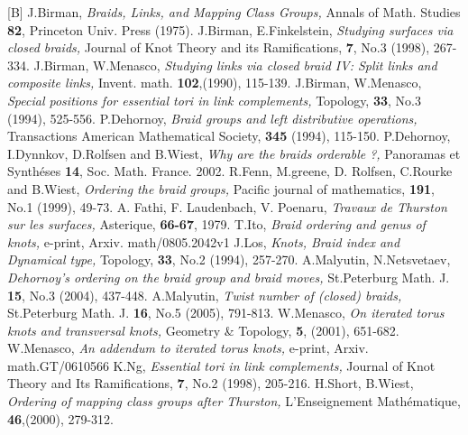 \documentclass[12pt]{amsart}
\begin{document}
 
\begin{thebibliography}{[B]}
 J.Birman,
{\em{Braids, Links, and Mapping Class Groups,}}
Annals of Math. Studies \textbf{82}, Princeton Univ. Press (1975).
 J.Birman, E.Finkelstein,
{\em{Studying surfaces via closed braids,}}
Journal of Knot Theory and its Ramifications, \textbf{7}, No.3 (1998), 267-334. 
 J.Birman, W.Menasco,
{\em{Studying links via closed braid IV: Split links and composite links,}}
Invent. math. \textbf{102},(1990), 115-139. 
 J.Birman, W.Menasco,
{\em{Special positions for essential tori in link complements,}}
Topology, \textbf{33}, No.3 (1994), 525-556. 
 P.Dehornoy, 
{\em{Braid groups and left distributive operations,}}
Transactions American Mathematical Society, \textbf{345} (1994), 115-150.
 P.Dehornoy, I.Dynnkov, D.Rolfsen and B.Wiest, 
{\em{Why are the braids orderable ?,}}
Panoramas et Synth\'eses \textbf{14}, Soc. Math. France. 2002.
 R.Fenn, M.greene, D. Rolfsen, C.Rourke and B.Wiest, 
{\em{Ordering the braid groups,}}
Pacific journal of mathematics, \textbf{191}, No.1 (1999), 49-73.
 A. Fathi, F. Laudenbach, V. Poenaru, 
{\em{Travaux de Thurston sur les surfaces,}}
Asterique, \textbf{66-67}, 1979.
 T.Ito, 
{\em{Braid ordering and genus of knots,}}
e-print, Arxiv. math/0805.2042v1
 J.Los, 
{\em{Knots, Braid index and Dynamical type,}}
Topology, \textbf{33}, No.2 (1994), 257-270. 
 A.Malyutin, N.Netsvetaev,
{\em{Dehornoy's ordering on the braid group and braid moves,}}
St.Peterburg Math. J. \textbf{15}, No.3 (2004), 437-448.
 A.Malyutin,
{\em{Twist number of (closed) braids,}}
St.Peterburg Math. J. \textbf{16}, No.5 (2005), 791-813.
 W.Menasco,
{\em{On iterated torus knots and transversal knots,}}
Geometry \& Topology, \textbf{5}, (2001), 651-682.
 W.Menasco,
{\em{An addendum to iterated torus knots,}}
e-print, Arxiv. math.GT/0610566
 K.Ng,
{\em{Essential tori in link complements,}}
Journal of Knot Theory and Its Ramifications, \textbf{7}, No.2 (1998), 205-216.
 H.Short, B.Wiest,
{\em{Ordering of mapping class groups after Thurston,}}
L'Enseignement Math\'ematique, \textbf{46},(2000), 279-312.
\end{thebibliography}
\end{document}
